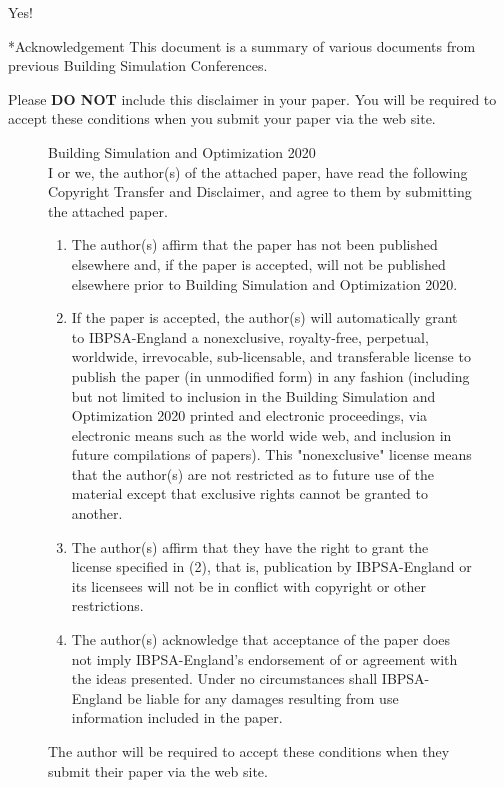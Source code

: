 \documentclass[twocolumn, a4paper,10pt]{article}
\makeatletter
\renewcommand\section{\@startsection{section}{1}{\z@}{0.25cm}{0.1cm}{\normalfont\large\bfseries}}
\makeatother
\begin{document}
\cite{ChuMajumdar2012} Yes!

\section*{Acknowledgement}
This document is a summary of various documents from previous Building Simulation Conferences.





\newpage
\onecolumn
Please \textbf{DO NOT} include this disclaimer in your paper.  You will be required to accept these conditions when you  submit your paper via the web site.

\begin{figure}
\centering
\begin{boxedminipage}{\textwidth}
Building Simulation and Optimization 2020\\

I or we, the author(s) of the attached paper, have read the following Copyright Transfer and Disclaimer, and agree to them by submitting the attached paper.
\begin{enumerate}
\item
The author(s) affirm that the paper has not been published elsewhere and, if the paper is accepted, will not be published elsewhere prior to Building Simulation and Optimization 2020.
\item
If the paper is accepted, the author(s) will automatically grant to IBPSA-England a nonexclusive, royalty-free, perpetual, worldwide, irrevocable, sub-licensable, and transferable license to publish the paper (in unmodified form) in any fashion (including but not limited to inclusion in the Building Simulation and Optimization 2020 printed and electronic proceedings, via electronic means such as the world wide web, and inclusion in future compilations of papers).  This "nonexclusive" license means that the author(s) are not restricted as to future use of the material except that exclusive rights cannot be granted to another.
\item
The author(s) affirm that they have the right to grant the license specified in (2), that is, publication by IBPSA-England or its licensees will not be in conflict with copyright or other restrictions.
\item
The author(s) acknowledge that acceptance of the paper does not imply IBPSA-England's endorsement of or agreement with the ideas presented.  Under no circumstances shall IBPSA-England be liable for any damages resulting from use information included in the paper.
\end{enumerate}
\end{boxedminipage}
\caption{The author will be required to accept these conditions when they submit their paper via the web site.}
\label{fig:fig02}
\end{figure}
\end{document}
